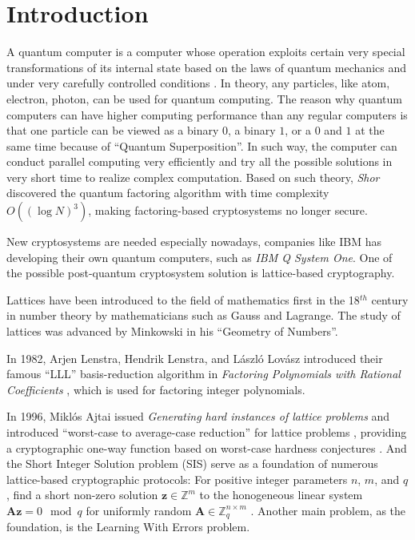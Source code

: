 \section{Introduction}
\par A quantum computer is a computer whose operation exploits certain very special transformations of its internal state based on the laws of quantum mechanics and under very carefully controlled conditions \cite{Quantum}. In theory, any particles, like atom, electron, photon, can be used for quantum computing. The reason why quantum computers can have higher computing performance than any regular computers is that one particle can be viewed as a binary $0$, a binary $1$, or a $0$ and $1$ at the same time because of ``Quantum Superposition''. In such way, the computer can conduct parallel computing very efficiently and try all the possible solutions in very short time to realize complex computation. Based on such theory, \textit{Shor} discovered the quantum factoring algorithm with time complexity $O((\log N)^{3})$, making factoring-based cryptosystems no longer secure.
\par New cryptosystems are needed especially nowadays, companies like IBM has developing their own quantum computers, such as \textit{IBM Q System One}. One of the possible post-quantum cryptosystem solution is lattice-based cryptography.
\par Lattices have been introduced to the field of mathematics first in the 18$^{th}$ century in number theory by mathematicians such as Gauss and Lagrange. The study of lattices was advanced by Minkowski in his ``Geometry of Numbers''.
\par In 1982, Arjen Lenstra, Hendrik Lenstra, and L\'{a}szl\'{o} Lov\'{a}sz introduced their famous ``LLL'' basis-reduction algorithm in \textit{Factoring Polynomials with Rational Coefficients} \cite{LLL}, which is used for factoring integer polynomials.
\par In 1996, Mikl\'{o}s Ajtai issued \textit{Generating hard instances of lattice problems} and introduced ``worst-case to average-case reduction'' for lattice problems , providing a cryptographic one-way function based on worst-case hardness conjectures \cite{Ajtai}. And the Short Integer Solution problem (SIS) serve as a foundation of numerous lattice-based cryptographic protocols: For positive integer parameters $n$, $m$, and $q$, find a short non-zero solution $\mathbf{z} \in \mathbb{Z}^{m}$ to the honogeneous linear system $\mathbf{Az} = 0 \mod q$ for uniformly random $\mathbf{A} \in \mathbb{Z}_{q}^{n\times m}$ \cite{LS}. Another main problem, as the foundation, is the Learning With Errors problem.


